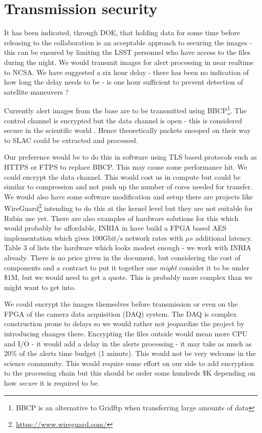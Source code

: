 \section{Transmission security} \label{sec:trans}

It has been indicated, through DOE, that holding data for some time before releasing to the collaboration is an acceptable approach to securing the images - this can be ensured by limiting the LSST personnel who have access to the files during the night.
We would transmit images for alert processing in near realtime to NCSA. We have suggested a six hour delay - there has been no indication of how long the delay needs to be - is one hour sufficient to prevent detection of satellite maneuvers ?

Currently alert images from the base are to be transmitted using BBCP\footnote{BBCP is an alternative to Gridftp when transferring large amounts of data}. The control channel is encrypted but the data channel is open - this is considered secure in the scientific world \citep{bbcp}. Hence theoretically packets snooped on their way to SLAC  could be extracted and processed.


Our preference would be to do this in software using TLS based protocols such as HTTPS or FTPS to replace BBCP. This may cause some performance hit.
We could encrypt the data  channel. This would cost us in  compute but could be similar to compression and not push up the number of cores needed for transfer. We would also have some software modification and setup there are projects like WireGuard\footnote{\url{https://www.wireguard.com/}} intending to do this at the kernel level but they are not suitable for Rubin use yet.
There are also  examples of hardware solutions for this which would probably be affordable, INRIA in \cite{10.1007/978-3-642-45073-0_1} have build a FPGA based AES\cite{aes} implementation  which gives 100Gbit/s network rates with $\mu s$ additional latency. Table 3 of \cite{10.1007/978-3-642-45073-0_1} lists the hardware which looks modest enough - we work with INRIA already. There is no price given in the document, but considering the cost of components and a contract to put it together one \emph{might} consider it to be  under \$1M, but we would need to get a quote. This is probably more complex than we might want to get into.

We could encrypt the images themselves before transmission or even on the FPGA of the camera data acquisition (DAQ) system.  The DAQ is complex construction prone to delays so we would rather not jeopardize the project by introducing changes there. Encrypting the files outside would mean more CPU and I/O - it would add a delay in the alerts processing - it may take as much as 20\% of the alerts time budget (1 minute).  This would not be very welcome in the science community. This would require some effort on our side to add encryption to the processing chain but this should be order some hundreds \$K depending on how \emph{secure} it is required to be.

